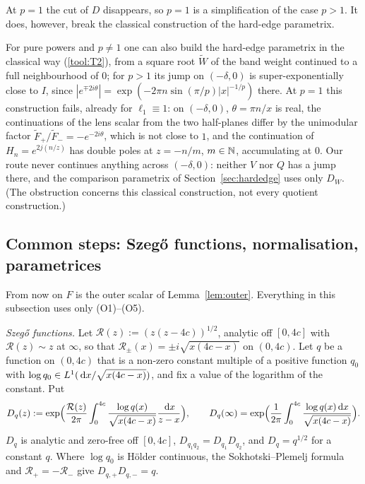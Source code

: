 At $p=1$ the cut of $D$ disappears, so $p=1$ is a simplification of the case $p>1$. It does, however, break the
classical construction of the hard-edge parametrix.

\begin{remark}[The classical hard-edge parametrix at $p=1$]\label{rem:quotient-p1}
For pure powers and $p\ne1$ one can also build the hard-edge parametrix in the classical way (\ref{tool:T2}), from a
square root $\tilde W$ of the band weight continued to a full neighbourhood of $0$; for $p>1$ its jump on $(-\delta,0)$
is super-exponentially close to $I$, since $|e^{\mp2i\theta}|=\exp(-2\pi n\sin(\pi/p)|x|^{-1/p})$ there. At $p=1$ this
construction fails, already for $\ell_1\equiv1$: on $(-\delta,0)$, $\theta=\pi n/x$ is real, the continuations of the
lens scalar from the two half-planes differ by the unimodular factor $\tilde F_+/\tilde F_-=-e^{-2i\theta}$, which is not
close to $1$, and the continuation of $H_n=e^{2j(n/z)}$ has double poles at $z=-n/m$, $m\in\mathbb{N}$, accumulating at $0$.
Our route never continues anything across $(-\delta,0)$: neither $V$ nor $Q$ has a jump there, and the comparison
parametrix of Section~\ref{sec:hardedge} uses only $D_W$. (The obstruction concerns this classical construction, not
every quotient construction.)
\end{remark}

\subsection{\texorpdfstring{Common steps: Szeg\H{o} functions, normalisation, parametrices}{Common steps: Szego functions, normalisation, parametrices}}\label{sec:outer-common}
From now on $F$ is the outer scalar of Lemma~\ref{lem:outer}. Everything in this subsection uses only (O1)--(O5).

\emph{Szeg\H{o} functions.} Let $\mathcal R(z):=(z(z-4c))^{1/2}$, analytic off $[0,4c]$ with $\mathcal R(z)\sim z$ at
$\infty$, so that $\mathcal R_\pm(x)=\pm i\sqrt{x(4c-x)}$ on $(0,4c)$. Let $q$ be a function on $(0,4c)$ that is a
non-zero constant multiple of a positive function $q_0$ with $\log q_0\in L^1(\,\mathrm{d} x/\sqrt{x(4c-x)})$, and fix a value
of the logarithm of the constant. Put
\begin{equation}\label{eq:szego}
  D_q(z):=\exp\Bigl(\frac{\mathcal R(z)}{2\pi}\int_0^{4c}\frac{\log q(x)}{\sqrt{x(4c-x)}}\frac{\,\mathrm{d} x}{z-x}\Bigr),\qquad
  D_q(\infty)=\exp\Bigl(\frac1{2\pi}\int_0^{4c}\frac{\log q(x)\,\mathrm{d} x}{\sqrt{x(4c-x)}}\Bigr).
\end{equation}
$D_q$ is analytic and zero-free off $[0,4c]$, $D_{q_1q_2}=D_{q_1}D_{q_2}$, and $D_q=q^{1/2}$ for a constant $q$. Where
$\log q_0$ is H\"older continuous, the Sokhotski--Plemelj formula and $\mathcal R_+=-\mathcal R_-$ give $D_{q,+}D_{q,-}=q$.

